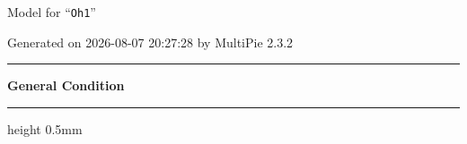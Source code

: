 \documentclass[fleqn,10pt,landscape]{jsarticle}
\begin{document}
\setcounter{MaxMatrixCols}{32}

\renewcommand{\tablename}{Table~}
\renewcommand{\figurename}{Figure~}
\setlength{\baselineskip}{16pt}
\setlength{\parindent}{0pt}
\setlength{\mathindent}{0pt}
\footnotesize
\begin{center}
\LARGE
Model for ``\texttt{Oh1}''
\end{center}
\begin{flushright}
Generated on 2026-08-07 20:27:28 by MultiPie 2.3.2
\end{flushright}
\setlength{\baselineskip}{16pt}
\footnotesize
\vspace{5mm}
\noindent \rule[0.5mm]{5mm}{0.5mm}\hspace{3mm}\textbf{General Condition}\hspace{3mm}\leaders\hrule height 0.5mm\hfill\kern0pt
\vspace{3mm}
\end{document}
